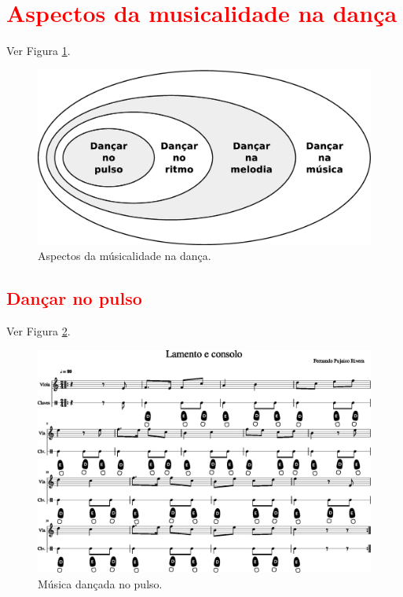 \newpage

\section{\textcolor{red}{Aspectos da musicalidade na dança}}

Ver Figura \ref{fig:aspectos-musica}.
\begin{figure}[h!]
    \centering
    \includegraphics[width=\textwidth]{chapters/cap-musicalidade-tecnica/aspectos-musica.eps}
    \caption{Aspectos da músicalidade na dança.}
    \label{fig:aspectos-musica}
\end{figure}

\subsection{\textcolor{red}{Dançar no pulso}}
Ver Figura \ref{fig:lamentoconsolopulso1}.
\begin{figure}
    \centering
    \includegraphics[width=\textwidth]{chapters/cap-musicalidade-tecnica/lamento-e-consolo-clave-pulso-1.eps}
    \caption{Música dançada no pulso.}
    \label{fig:lamentoconsolopulso1}
\end{figure}

